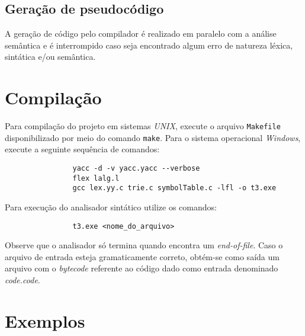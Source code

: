 \documentclass{article}
\begin{document}

	\subsection{Geração de pseudocódigo} %
	\label{sub:geracao_de_pseudocodigo}
		A geração de código pelo compilador é realizado em paralelo com a análise semântica e é interrompido caso seja encontrado algum erro de natureza léxica, sintática e/ou semântica.



\section{Compilação} %
\label{sec:compilacao}
	Para compilação do projeto em sistemas \emph{UNIX}, execute o arquivo \verb=Makefile= disponibilizado por meio do comando \verb=make=. Para o sistema operacional \emph{Windows}, execute a seguinte sequência de comandos:

	\begin{center}
		\begin{minipage}[ht]{0.5\textwidth}
			\begin{verbatim}
				yacc -d -v yacc.yacc --verbose 
				flex lalg.l
				gcc lex.yy.c trie.c symbolTable.c -lfl -o t3.exe
			\end{verbatim}
		\end{minipage}
	\end{center}

	Para execução do analisador sintático utilize os comandos:

	\begin{center}
		\begin{minipage}[ht]{0.5\textwidth}
			\begin{verbatim}
				t3.exe <nome_do_arquivo>
			\end{verbatim}
		\end{minipage}
	\end{center}

	Observe que o analisador só termina quando encontra um \emph{end-of-file}. Caso o arquivo de entrada esteja gramaticamente correto, obtém-se como saída um arquivo com o \emph{bytecode} referente ao código dado como entrada denominado \emph{code.code}.

\section{Exemplos} %
\label{sec:exemplos}

\end{document}

